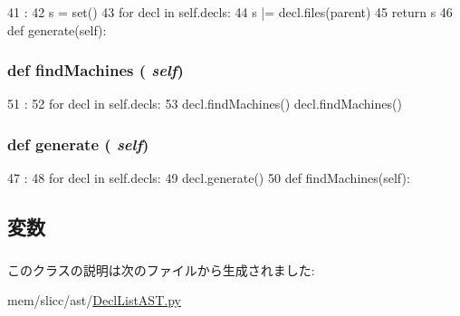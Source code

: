 \begin{DoxyCode}
41                                 :
42         s = set()
43         for decl in self.decls:
44             s |= decl.files(parent)
45         return s
46 
    def generate(self):
\end{DoxyCode}
\hypertarget{classslicc_1_1ast_1_1DeclListAST_1_1DeclListAST_a716f8a2874cc6a4d0c5ed3c2f90f236d}{
\subsubsection[{findMachines}]{\setlength{\rightskip}{0pt plus 5cm}def findMachines ( {\em self})}}
\label{classslicc_1_1ast_1_1DeclListAST_1_1DeclListAST_a716f8a2874cc6a4d0c5ed3c2f90f236d}



\begin{DoxyCode}
51                           :
52         for decl in self.decls:
53             decl.findMachines()
            decl.findMachines()
\end{DoxyCode}
\hypertarget{classslicc_1_1ast_1_1DeclListAST_1_1DeclListAST_a4555d1cee0dccf3942ea35fe86de2e8e}{
\subsubsection[{generate}]{\setlength{\rightskip}{0pt plus 5cm}def generate ( {\em self})}}
\label{classslicc_1_1ast_1_1DeclListAST_1_1DeclListAST_a4555d1cee0dccf3942ea35fe86de2e8e}



\begin{DoxyCode}
47                       :
48         for decl in self.decls:
49             decl.generate()
50 
    def findMachines(self):
\end{DoxyCode}


\subsection{変数}
\hypertarget{classslicc_1_1ast_1_1DeclListAST_1_1DeclListAST_a0bfd0c6209d776dae593ee7c78d9aed8}{
\subsubsection[{decls}]{}}
\label{classslicc_1_1ast_1_1DeclListAST_1_1DeclListAST_a0bfd0c6209d776dae593ee7c78d9aed8}


このクラスの説明は次のファイルから生成されました:\begin{DoxyCompactItemize}
\item 
mem/slicc/ast/\hyperlink{DeclListAST_8py}{DeclListAST.py}\end{DoxyCompactItemize}
